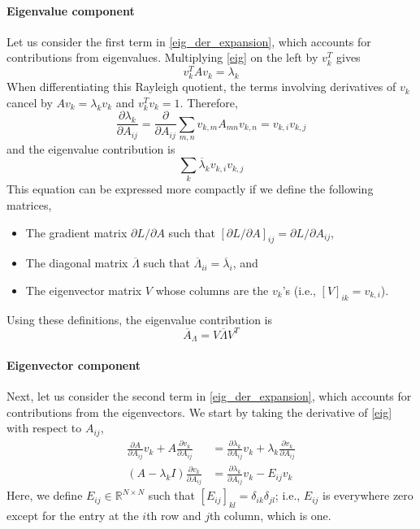 \documentclass[11pt, a4paper]{article}
\begin{document}
\paragraph{Eigenvalue component}
Let us consider the first term in \eqref{eig_der_expansion}, which accounts for contributions from eigenvalues. Multiplying \eqref{eig} on the left by $v_k^T$ gives
\begin{equation}
    v_k^T Av_k = \lambda_k
\end{equation}
When differentiating this Rayleigh quotient, the terms involving derivatives of $v_k$ cancel by $Av_k=\lambda_k v_k$ and $v_k^Tv_k=1$. Therefore,
\begin{equation}
    \frac{\partial \lambda_k}{\partial A_{ij}}=\frac{\partial}{\partial A_{ij}}\sum_{m,n}v_{k,m}A_{mn}v_{k,n}=v_{k,i}v_{k,j}
\end{equation}
and the eigenvalue contribution is
\begin{equation}
    \sum_k \overline{\lambda}_k v_{k,i}v_{k,j}
\end{equation}
This equation can be expressed more compactly if we define the following matrices,
\begin{itemize}
    \item The gradient matrix $\partial L/\partial A$ such that $[\partial L/\partial A]_{ij} = \partial L/\partial A_{ij}$,
    \item The diagonal matrix $\overline\Lambda$ such that $\overline{\Lambda}_{ii}=\overline{\lambda}_i$, and
    \item The eigenvector matrix $V$ whose columns are the $v_k$'s (i.e., $[V]_{ik}=v_{k,i}$).
\end{itemize}
Using these definitions, the eigenvalue contribution is
\begin{equation}
\boxed{
    \overline A_\Lambda = V\overline\Lambda V^T
    \label{dLdA_via_eigenvalues}
}
\end{equation}


\paragraph{Eigenvector component}
Next, let us consider the second term in \eqref{eig_der_expansion}, which accounts for contributions from the eigenvectors. We start by taking the derivative of \eqref{eig} with respect to $A_{ij}$,
\begin{align}
    \frac{\partial A}{\partial A_{ij}}v_k + A\frac{\partial v_k}{\partial A_{ij}} & = \frac{\partial \lambda_k}{\partial A_{ij}}v_k + \lambda_k\frac{\partial v_k}{\partial A_{ij}} \\ (A - \lambda_k I)\frac{\partial v_{k}}{\partial A_{ij}} & = \frac{\partial\lambda_k}{\partial A_{ij}}v_{k} - E_{ij}v_k \label{eig_vec_der_mat_form}
\end{align} 
Here, we define $E_{ij}\in\mathbb R^{N\times N}$ such that $[E_{ij}]_{kl}=\delta_{ik}\delta_{jl}$; i.e., $E_{ij}$ is everywhere zero except for the entry at the $i$th row and $j$th column, which is one.
\end{document}
